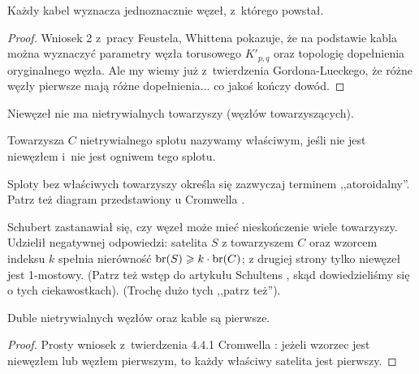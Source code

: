 \begin{proposition}
    Każdy kabel wyznacza jednoznacznie węzeł, z~którego powstał.
\end{proposition}

\begin{proof}
%
%
    Wniosek 2 z~pracy Feustela, Whittena \cite{feustel1978} pokazuje, że na podstawie kabla można wyznaczyć parametry węzła torusowego $K'_{p,q}$ oraz topologię dopełnienia oryginalnego węzła.
    Ale my wiemy już z~twierdzenia Gordona-Lueckego, że różne węzły pierwsze mają różne dopełnienia... co jakoś kończy dowód.
\end{proof}

Niewęzeł nie ma nietrywialnych towarzyszy (węzłów towarzyszących).

\begin{definition}
%
    Towarzysza $C$ nietrywialnego splotu nazywamy właściwym, jeśli nie jest niewęzłem i~nie jest ogniwem tego splotu.
\end{definition}

Sploty bez właściwych towarzyszy określa się zazwyczaj terminem ,,atoroidalny''.
%
Patrz też diagram przedstawiony u Cromwella \cite[s. 83]{cromwell2004}.

Schubert \cite{schubert1954} zastanawiał się, czy węzeł może mieć nieskończenie wiele towarzyszy.
%
Udzielił negatywnej odpowiedzi: satelita $S$ z towarzyszem $C$ oraz wzorcem indeksu $k$ spełnia nierówność $\operatorname{br}(S) \geqslant k \cdot \operatorname{br}(C)$; z drugiej strony tylko niewęzeł jest 1-mostowy.
(Patrz też wstęp do artykułu Schultens \cite{schultens2003}, skąd dowiedzieliśmy się o tych ciekawostkach).
(Trochę dużo tych ,,patrz też'').

\begin{proposition}
%
%
    Duble nietrywialnych węzłów oraz kable są pierwsze.
\end{proposition}

\begin{proof}
    Prosty wniosek z~twierdzenia 4.4.1 Cromwella \cite[s. 84]{cromwell2004}: jeżeli wzorzec jest niewęzłem lub węzłem pierwszym, to każdy właściwy satelita jest pierwszy.
\end{proof}

